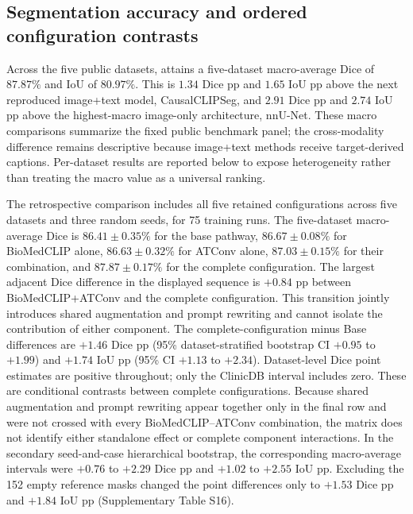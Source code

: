 \subsection{Segmentation accuracy and ordered configuration contrasts}
Across the five public datasets, \methodname{} attains a five-dataset macro-average Dice
of $87.87\%$ and IoU of $80.97\%$. This is $1.34$ Dice pp and $1.65$ IoU pp
above the next reproduced image+text model, CausalCLIPSeg, and $2.91$ Dice pp
and $2.74$ IoU pp above the highest-macro image-only architecture, nnU-Net.
These macro comparisons summarize the fixed public benchmark panel; the
cross-modality difference remains descriptive because image+text methods receive
target-derived captions. Per-dataset results are reported below to expose
heterogeneity rather than treating the macro value as a universal ranking.

\def\BmcTableSelection{4}


The retrospective comparison includes all five retained configurations across five
datasets and three random seeds, for 75 training runs. The five-dataset
macro-average Dice is $86.41\pm0.35\%$ for the base pathway,
$86.67\pm0.08\%$ for BioMedCLIP alone, $86.63\pm0.32\%$ for ATConv alone,
$87.03\pm0.15\%$ for their combination, and $87.87\pm0.17\%$ for the complete
\methodname{} configuration. The largest adjacent Dice difference in the
displayed sequence is $+0.84$ pp between BioMedCLIP+ATConv and the complete
configuration. This transition jointly introduces shared augmentation and
prompt rewriting and cannot isolate the contribution of either component. The
complete-configuration minus Base differences are $+1.46$ Dice pp (95\%
dataset-stratified bootstrap CI $+0.95$ to $+1.99$) and $+1.74$ IoU pp (95\% CI
$+1.13$ to $+2.34$). Dataset-level Dice point estimates are positive throughout;
only the ClinicDB interval includes zero. These are conditional contrasts between
complete configurations. Because shared augmentation and prompt rewriting appear together only in the
final row and were not crossed with every BioMedCLIP--ATConv combination, the
matrix does not identify either standalone effect or complete component interactions.
In the secondary seed-and-case hierarchical bootstrap, the corresponding
macro-average intervals were $+0.76$ to $+2.29$ Dice pp and $+1.02$ to $+2.55$
IoU pp. Excluding the 152 empty reference masks changed the point differences
only to $+1.53$ Dice pp and $+1.84$ IoU pp (Supplementary Table S16).

